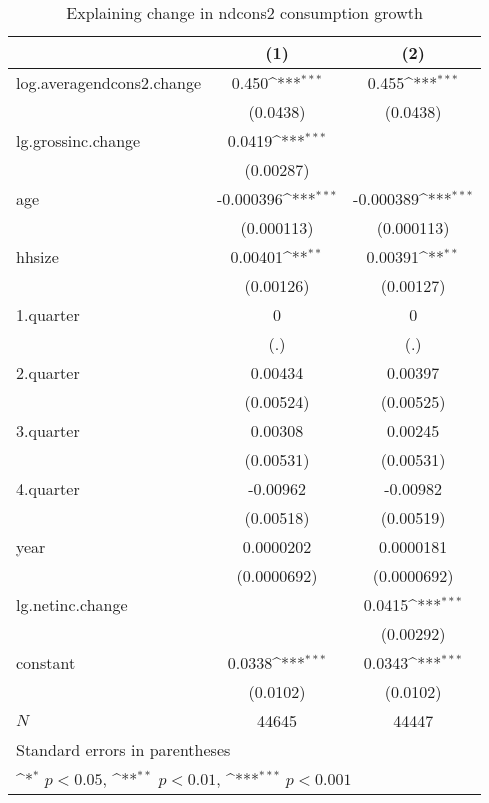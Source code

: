 \begin{table}[htbp]\centering
\def\sym#1{\ifmmode^{#1}\else\(^{#1}\)\fi}
\caption{\label{tab:logndcons2-deltacons} Explaining change in ndcons2 consumption growth}
\begin{tabular}{l*{2}{c}}
\hline\hline
            &\multicolumn{1}{c}{(1)}         &\multicolumn{1}{c}{(2)}         \\
\hline
log.averagendcons2.change&       0.450\sym{***}&       0.455\sym{***}\\
            &    (0.0438)         &    (0.0438)         \\
lg.grossinc.change&      0.0419\sym{***}&                     \\
            &   (0.00287)         &                     \\
age         &   -0.000396\sym{***}&   -0.000389\sym{***}\\
            &  (0.000113)         &  (0.000113)         \\
hhsize      &     0.00401\sym{**} &     0.00391\sym{**} \\
            &   (0.00126)         &   (0.00127)         \\
1.quarter   &           0         &           0         \\
            &         (.)         &         (.)         \\
2.quarter   &     0.00434         &     0.00397         \\
            &   (0.00524)         &   (0.00525)         \\
3.quarter   &     0.00308         &     0.00245         \\
            &   (0.00531)         &   (0.00531)         \\
4.quarter   &    -0.00962         &    -0.00982         \\
            &   (0.00518)         &   (0.00519)         \\
year        &   0.0000202         &   0.0000181         \\
            & (0.0000692)         & (0.0000692)         \\
lg.netinc.change&                     &      0.0415\sym{***}\\
            &                     &   (0.00292)         \\
constant    &      0.0338\sym{***}&      0.0343\sym{***}\\
            &    (0.0102)         &    (0.0102)         \\
\hline
\(N\)       &       44645         &       44447         \\
\hline\hline
\multicolumn{3}{l}{\footnotesize Standard errors in parentheses}\\
\multicolumn{3}{l}{\footnotesize \sym{*} \(p<0.05\), \sym{**} \(p<0.01\), \sym{***} \(p<0.001\)}\\
\end{tabular}
\end{table}
